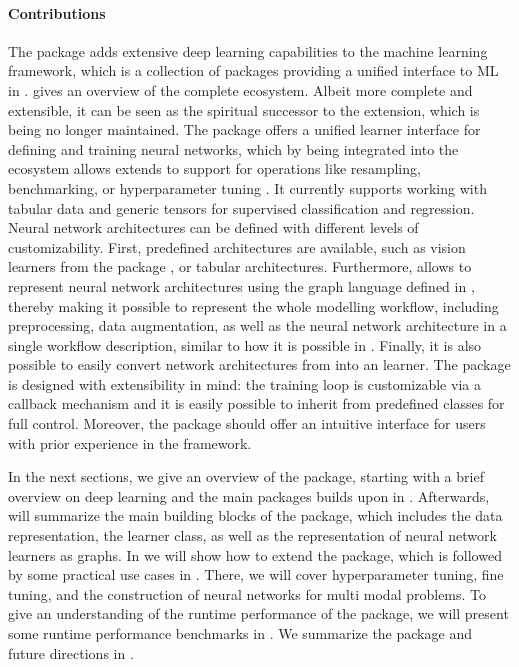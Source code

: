 \documentclass[article]{jss}
\theoremstyle{definition}
\begin{document}
\paragraph{Contributions} The  package adds extensive deep learning capabilities to the \mlrt{} machine learning framework, which is a collection of \rlang{} packages providing a unified interface to ML in \rlang{}.
 gives an overview of the complete ecosystem.
Albeit more complete and extensible, it can be seen as the spiritual successor to the  \citep{ref-mlr3keras2021} extension, which is being no longer maintained.
The package offers a unified learner interface for defining and training neural networks, which by being integrated into the ecosystem allows extends to support for operations like resampling, benchmarking, or hyperparameter tuning \citep{ref-mlr3tuning2024}.
It currently supports working with tabular data and generic tensors for supervised classification and regression.
Neural network architectures can be defined with different levels of customizability.
First, predefined architectures are available, such as vision learners from the  \rlang{} package \citep{ref-r-torchvision}, or tabular architectures.
Furthermore, \mlrttorch{} allows to represent neural network architectures using the graph language defined in \mlrtpipelines{}, thereby making it possible to represent the whole modelling workflow, including preprocessing, data augmentation, as well as the neural network architecture in a single workflow description, similar to how it is possible in \keras{} \citep{ref-chollet2018keras}.
Finally, it is also possible to easily convert network architectures from \torch{} into an \mlrt{} learner.
The package is designed with extensibility in mind: the training loop is customizable via a callback mechanism and it is easily possible to inherit from predefined classes for full control.
Moreover, the package should offer an intuitive interface for users with prior experience in the \mlrt{} framework.

In the next sections, we give an overview of the package, starting with a brief overview on deep learning and the main \rlang{} packages \mlrttorch{} builds upon in .
Afterwards,  will summarize the main building blocks of the package, which includes the data representation, the learner class, as well as the representation of neural network learners as graphs.
In  we will show how to extend the package, which is followed by some practical use cases in .
There, we will cover hyperparameter tuning, fine tuning, and the construction of neural networks for multi modal problems.
To give an understanding of the runtime performance of the package, we will present some runtime performance benchmarks in .
We summarize the package and future directions in .
\end{document}
